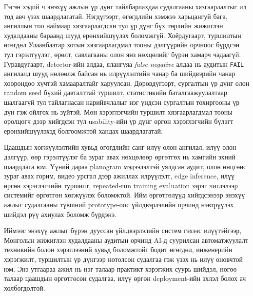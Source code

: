 Гэсэн хэдий ч энэхүү ажлын үр дүнг тайлбарлахдаа судалгааны хязгаарлалтыг ил тод авч үзэх шаардлагатай. Нэгдүгээрт, өгөгдлийн хэмжээ харьцангуй бага, ангиллын тоо наймаар хязгаарлагдсан тул үр дүнг бүх төрлийн жижиглэн худалдааны бараанд шууд ерөнхийшүүлэх боломжгүй. Хоёрдугаарт, туршилтын өгөгдөл Улаанбаатар хотын хязгаарлагдмал тооны дэлгүүрийн орчноос бүрдсэн тул гэрэлтүүлэг, өрөлт, савлагааны олон янз нөхцөлийг бүрэн хамарч чадаагүй. Гуравдугаарт, detector-ийн алдаа, ялангуяа \textit{false negative} алдаа нь аудитын \texttt{FAIL} ангилалд шууд нөлөөлж байсан нь илрүүлэлтийн чанар ба шийдвэрийн чанар хоорондоо хүчтэй хамааралтайг харуулсан. Дөрөвдүгээрт, сургалтын үр дүнг олон random seed бүхий давталттай туршилт, статистикийн баталгаажуулалтаар шалгаагүй тул тайлагнасан нарийвчлалыг нэг үндсэн сургалтын тохиргооны үр дүн гэж ойлгох нь зүйтэй. Мөн хэрэглэгчийн туршилт хязгаарлагдмал тооны оролцогч дээр хийгдсэн тул usability-ийн үр дүнг өргөн хэрэглэгчийн бүлэгт ерөнхийшүүлэхэд болгоомжтой хандах шаардлагатай.

Цаашдын хөгжүүлэлтийн хувьд өгөгдлийн санг илүү олон ангилал, илүү олон дэлгүүр, өөр гэрэлтүүлэг ба зураг авах нөхцөлөөр өргөтгөх нь хамгийн эхний шаардлага юм. Үүний дараа planogram мэдээлэлтэй уялдсан аудит, олон өнцгөөс зураг авах горим, видео урсгал дээр ажиллах илрүүлэлт, edge inference, илүү өргөн хэрэглэгчийн туршилт, repeated-run training evaluation зэрэг чиглэлээр системийг өргөтгөн хөгжүүлэх боломжтой. Ийм өргөтгөлүүд хийгдсэнээр энэхүү ажлыг судалгааны түвшний prototype-оос үйлдвэрлэлийн орчинд нэвтрүүлэх шийдэл рүү ахиулах боломж бүрдэнэ.

Иймээс энэхүү ажлыг бүрэн дууссан үйлдвэрлэлийн систем гэхээс илүүтэйгээр, Монголын жижиглэн худалдааны аудитын орчинд AI-д суурилсан автоматжуулалт техникийн болон хэрэглээний хувьд боломжтойг бодит өгөгдөл, инженерийн хэрэгжилт, туршилтын үр дүнгээр нотолсон судалгаа гэж үзэх нь илүү оновчтой юм. Энэ утгаараа ажил нь нэг талаар практикт хэрэгжих суурь шийдэл, нөгөө талаар цаашдын өргөтгөсөн судалгаа, илүү өргөн deployment-ийн эхлэл болох ач холбогдолтой.
